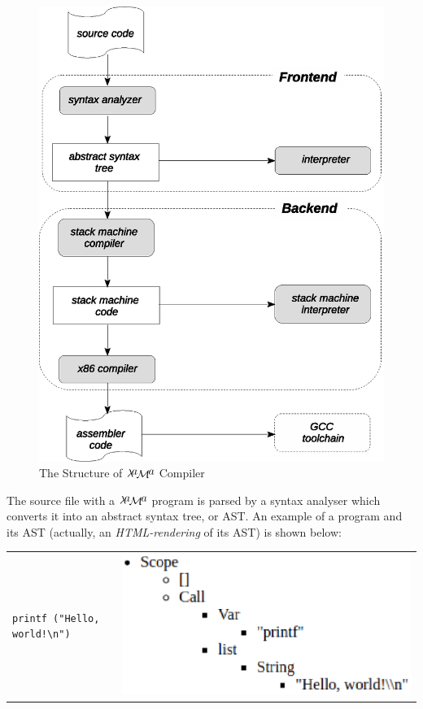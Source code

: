 \documentclass{book}
\newcommand{\lama}{$\lambda\kern -.1667em\lower -.5ex\hbox{$a$}\kern -.1000em\lower .2ex\hbox{$\mathcal M$}\kern -.1000em\lower -.5ex\hbox{$a$}$\xspace}
\begin{document}
\begin{figure}[t]
  \centering
  \includegraphics[scale=0.7]{images/01-07.eps}
  \caption{The Structure of \lama Compiler}
  \label{lama-comp}
\end{figure}

The source file with a \lama program is parsed by a syntax analyser which converts it into an
abstract syntax tree, or AST. An example of a program and its AST (actually, an \emph{HTML-rendering}
of its AST) is shown below:

\begin{tabular}{m{5cm}m{5cm}}
  \begin{lstlisting}[basicstyle=\small]
 printf ("Hello, world!\n")
  \end{lstlisting} &
  \includegraphics[scale=0.55]{images/01-08.eps}
\end{tabular}
\end{document}
